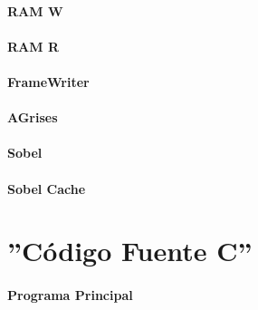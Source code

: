 \documentclass[a4paper,12pt,titlepage,final]{book}
\begin{document}
\subsubsection{RAM W}

\subsubsection{RAM R}

\subsubsection{FrameWriter}

\subsubsection{AGrises}

\subsubsection{Sobel}

\subsubsection{Sobel Cache}


\chapter{''Código Fuente C''}
\subsubsection{Programa Principal}
\lstset{
language=c
}


\backmatter



\end{document}
